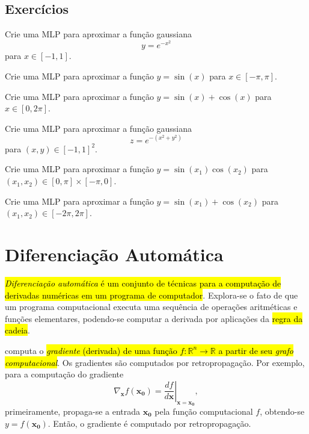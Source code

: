 \subsection{Exercícios}

\begin{exer}
  Crie uma MLP para aproximar a função gaussiana
  \begin{equation}
    y = e^{-x^2}
  \end{equation}
  para $x\in [-1, 1]$.
\end{exer}

\begin{exer}
  Crie uma MLP para aproximar a função $y = \sin(x)$ para $x\in [-\pi, \pi]$.
\end{exer}

\begin{exer}
  Crie uma MLP para aproximar a função $y = \sin(x) + \cos(x)$ para $x\in [0, 2\pi]$.
\end{exer}

\begin{exer}
  Crie uma MLP para aproximar a função gaussiana
  \begin{equation}
    z = e^{-(x^2 + y^2)}
  \end{equation}
  para $(x, y) \in [-1, 1]^2$.
\end{exer}

\begin{exer}
  Crie uma MLP para aproximar a função $y = \sin(x_1)\cos(x_2)$ para $(x_1, x_2)\in [0, \pi]\times [-\pi, 0]$.
\end{exer}

\begin{exer}
  Crie uma MLP para aproximar a função $y = \sin(x_1) + \cos(x_2)$ para $(x_1, x_2)\in [-2\pi, 2\pi]$.
\end{exer}

\section{Diferenciação Automática}\label{cap_mlp_sec_autograd}

\hl{\emph{Diferenciação automática} é um conjunto de técnicas para a computação de derivadas numéricas em um programa de computador}. Explora-se o fato de que um programa computacional executa uma sequência de operações aritméticas e funções elementares, podendo-se computar a derivada por aplicações da \hl{regra da cadeia}.

{\pytorch} computa o \hl{\emph{gradiente} (derivada) de uma função $f:\mathbb{R}^n\to\mathbb{R}$ a partir de seu \emph{grafo computacional}}. Os gradientes são computados por retropropagação. Por exemplo, para a computação do gradiente
\begin{equation}
  \nabla_{\pmb{x}}f(\pmb{x_0}) = \left.\frac{d f}{d \pmb{x}}\right|_{\pmb{x} = \pmb{x_0}},
\end{equation}
primeiramente, propaga-se a entrada $\pmb{x_0}$ pela função computacional $f$, obtendo-se $y = f(\pmb{x_0})$. Então, o gradiente é computado por retropropagação.

